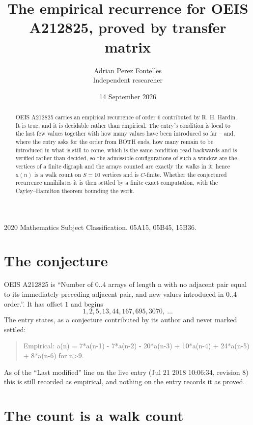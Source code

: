 \documentclass[11pt,a4paper]{article}
\title{The empirical recurrence for OEIS A212825, proved by transfer matrix}
\author{Adrian Perez Fontelles\\ \small Independent researcher}
\date{14 September 2026}
\theoremstyle{plain}
\theoremstyle{definition}
\begin{document}
\maketitle

\begin{abstract}
OEIS A212825 carries an empirical recurrence of order $6$ contributed by R. H. Hardin. It is
true, and it is decidable rather than empirical. The entry's condition is local to the last few values together with how many values have been introduced so far -- and, where the entry asks for the order from BOTH ends, how many remain to be introduced in what is still to come, which is the same condition read backwards and is verified rather than decided, so
the admissible configurations of such a window are the vertices of a finite digraph and the
arrays counted are exactly the walks in it; hence $a(n)$ is a walk count on $S=10$ vertices
and is $C$-finite. Whether the conjectured recurrence annihilates it is then settled by a
finite exact computation, with the Cayley--Hamilton theorem bounding the work.
\end{abstract}

\noindent\small 2020 Mathematics Subject Classification. 05A15, 05B45, 15B36.\normalsize

\section{The conjecture}

OEIS A212825 is ``Number of 0..4 arrays of length n with no adjacent pair equal to its immediately preceding adjacent pair, and new values introduced in 0..4 order.''. It has offset $1$ and begins
\[
1, 2, 5, 13, 44, 167, 695, 3070,\ \dots
\]
The entry states, as a conjecture contributed by its author and never marked settled:
\begin{quote}
Empirical: a(n) = 7*a(n-1) - 7*a(n-2) - 20*a(n-3) + 10*a(n-4) + 24*a(n-5) + 8*a(n-6) for n>9.
\end{quote}
As of the ``Last modified'' line on the live entry (Jul 21 2018 10:06:34, revision 8) this is still
recorded as empirical, and nothing on the entry records it as proved.

\section{The count is a walk count}
\end{document}
